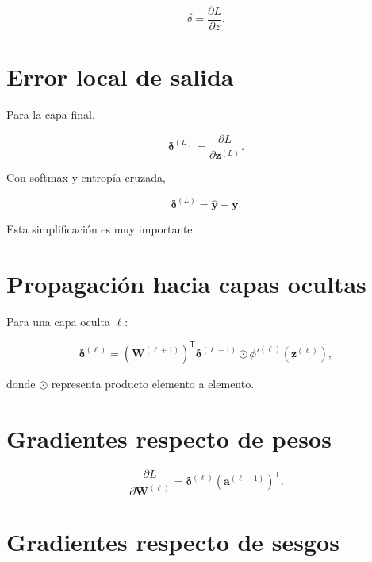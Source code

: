 \documentclass[
  spanish,
  10.5pt,
  letterpaper,
  DIV=11,
  numbers=noendperiod,
  oneside,
  open=any]{scrreprt}
\theoremstyle{definition}
\theoremstyle{definition}
\theoremstyle{plain}
\theoremstyle{remark}
\begin{document}
\[
\delta
=
\frac{\partial L}{\partial z}.
\]

\section*{Error local de salida}\label{error-local-de-salida}


Para la capa final,

\[
\boldsymbol{\delta}^{(L)}
=
\frac{\partial L}
{\partial \mathbf{z}^{(L)}}.
\]

Con softmax y entropía cruzada,

\[
\boldsymbol{\delta}^{(L)}
=
\widehat{\mathbf{y}}
-
\mathbf{y}.
\]

Esta simplificación es muy importante.

\section*{Propagación hacia capas
ocultas}\label{propagaciuxf3n-hacia-capas-ocultas}


Para una capa oculta \(\ell\):

\[
\boldsymbol{\delta}^{(\ell)}
=
\left(
\mathbf{W}^{(\ell+1)}
\right)^{\mathsf T}
\boldsymbol{\delta}^{(\ell+1)}
\odot
\phi'^{(\ell)}
\left(
\mathbf{z}^{(\ell)}
\right),
\]

donde \(\odot\) representa producto elemento a elemento.

\section*{Gradientes respecto de
pesos}\label{gradientes-respecto-de-pesos}


\[
\frac{\partial L}
{\partial \mathbf{W}^{(\ell)}}
=
\boldsymbol{\delta}^{(\ell)}
\left(
\mathbf{a}^{(\ell-1)}
\right)^{\mathsf T}.
\]

\section*{Gradientes respecto de
sesgos}\label{gradientes-respecto-de-sesgos}
\end{document}
